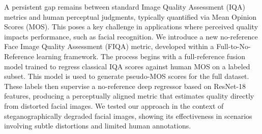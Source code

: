 A persistent gap remains between standard Image Quality Assessment (IQA) metrics and human perceptual judgments, typically quantified via Mean Opinion Scores (MOS). This poses a key challenge in applications where perceived quality impacts performance, such as facial recognition. We introduce a new no-reference Face Image Quality Assessment (FIQA) metric, developed within a Full-to-No-Reference learning framework. The process begins with a full-reference fusion model trained to regress classical IQA scores against human MOS on a labeled subset. This model is used to generate pseudo-MOS scores for the full dataset. These labels then supervise a no-reference deep regressor based on ResNet-18 features, producing a perceptually aligned metric that estimates quality directly from distorted facial images. We tested our approach in the context of steganographically degraded facial images, showing its effectiveness in scenarios involving subtle distortions and limited human annotations.